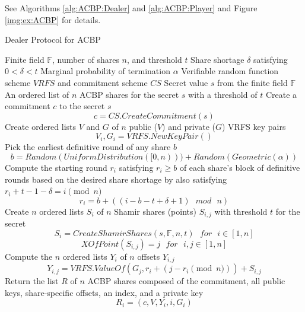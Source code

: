 \documentclass[12pt]{article}
\begin{document}
See Algorithms \ref{alg:ACBP:Dealer} and \ref{alg:ACBP:Player} and Figure \ref{img:ex:ACBP} for details.

\begin{algorithm}
  \caption{Dealer Protocol for ACBP}
  \label{alg:ACBP:Dealer}
  \begin{algorithmic}
    \INPUT Finite field $\mathbb{F}$, number of shares $n$, and threshold $t$
    \INPUT Share shortage $\delta$ satisfying $0 < \delta < t$
    \INPUT Marginal probability of termination $\alpha$
    \INPUT Verifiable random function scheme $VRFS$ and commitment scheme $CS$
    \INPUT Secret value $s$ from the finite field $\mathbb{F}$
    \OUTPUT An ordered list of $n$ ACBP shares for the secret $s$ with a threshold of $t$
    \STATE Create a commitment $c$ to the secret $s$
    	$$c = CS.CreateCommitment(s)$$
    \STATE Create ordered lists $V$ and $G$ of $n$ public ($V$) and private ($G$) VRFS key pairs
    	$$V_i, G_i = VRFS.NewKeyPair()$$
    \STATE Pick the earliest definitive round of any share $b$ 
	    $$b = Random(UniformDistribution([0,n))) + Random(Geometric(\alpha))$$
    \STATE Compute the starting round $r_i$ satisfying $r_i \geq b$ of each share's block of definitive rounds based on the desired share shortage by also satisfying $r_i + t - 1 - \delta = i \pmod{n}$
  	    $$r_i = b + ((i-b-t+\delta+1) \text{ } mod \text{ } n)$$
    \STATE Create $n$ ordered lists $S_i$ of $n$ Shamir shares (points) $S_{i,j}$ with threshold $t$ for the secret
  	    $$S_i = CreateShamirShares(s, \mathbb{F}, n, t) \text{ } for \text{ } i \in [1, n]$$
  	    $$XOfPoint(S_{i,j}) = j \text{ } for \text{ } i,j \in [1, n]$$
    \STATE Compute the $n$ ordered lists $Y_i$ of $n$ offsets $Y_{i,j}$
  	    $$Y_{i,j} = VRFS.ValueOf(G_j, r_i + (j-r_i \pmod{n})) + S_{i,j}$$
    \STATE Return the list $R$ of $n$ ACBP shares composed of the commitment, all public keys, share-specific offsets, an index, and a private key
    	$$R_i = (c, V, Y_i, i, G_i)$$
  \end{algorithmic}
\end{algorithm}
\end{document}
